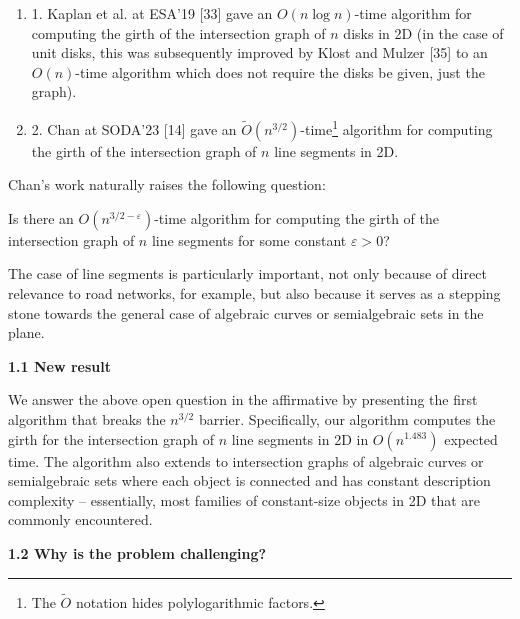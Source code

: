 \begin{enumerate}
\item[]  1. 
Kaplan et al. at ESA’19 [33] gave an $O(n\log n)$-time algorithm for computing the girth of the intersection graph of $n$ disks in 2D (in the case of unit disks, this was subsequently improved by Klost and Mulzer [35] to an $O(n)$-time algorithm which does not require the disks be given, just the graph).
\par
\par
\item[]  2. 
Chan at SODA’23 [14] gave an $\widetilde{O}(n^{3/2})$-time\footnote{The $\widetilde{O}$ notation hides polylogarithmic factors. } algorithm for computing the girth of the intersection graph of $n$ line segments in 2D.
\par
\par
\end{enumerate}
Chan’s work naturally raises the following question:
\par
Is there an $O(n^{3/2-\varepsilon})$-time algorithm for computing the girth of the intersection graph of $n$ line segments for some constant $\varepsilon>0$?
\par
\par
The case of line segments is particularly important, not only because of direct relevance to road networks, for example, but also because it serves as a stepping stone towards the general case of algebraic curves or semialgebraic sets in the plane.
\par
\par
\par\medskip\noindent\textbf{1.1 New result}\par
We answer the above open question in the affirmative by presenting the first algorithm that breaks the $n^{3/2}$ barrier. Specifically, our algorithm computes the girth for the intersection graph of $n$ line segments in 2D in $O(n^{1.483})$ expected time. The algorithm also extends to intersection graphs of algebraic curves or semialgebraic sets where each object is connected and has constant description complexity – essentially, most families of constant-size objects in 2D that are commonly encountered.
\par
\par
\par\medskip\noindent\textbf{1.2 Why is the problem challenging?}\par
